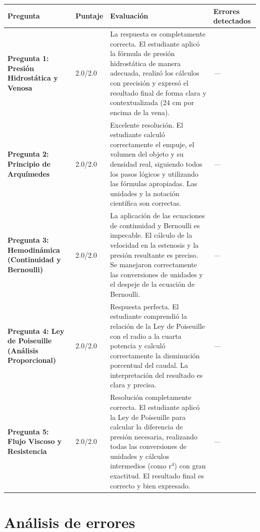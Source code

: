\documentclass[11pt,a4paper]{article}
\begin{document}
\begin{longtable}{>{\bfseries}p{2.8cm} p{1.6cm} p{7.0cm} p{2.8cm}}
  \toprule
  \textbf{Pregunta} & \textbf{Puntaje} & \textbf{Evaluación} & \textbf{Errores detectados} \\
  \midrule
  \endhead
  \bottomrule
  \endfoot
    \textbf{Pregunta 1: Presión Hidrostática y Venosa} & 2.0/2.0 & La respuesta es completamente correcta. El estudiante aplicó la fórmula de presión hidrostática de manera adecuada, realizó los cálculos con precisión y expresó el resultado final de forma clara y contextualizada (24 cm por encima de la vena). & \textit{---} \\
    \midrule
    \textbf{Pregunta 2: Principio de Arquímedes} & 2.0/2.0 & Excelente resolución. El estudiante calculó correctamente el empuje, el volumen del objeto y su densidad real, siguiendo todos los pasos lógicos y utilizando las fórmulas apropiadas. Las unidades y la notación científica son correctas. & \textit{---} \\
    \midrule
    \textbf{Pregunta 3: Hemodinámica (Continuidad y Bernoulli)} & 2.0/2.0 & La aplicación de las ecuaciones de continuidad y Bernoulli es impecable. El cálculo de la velocidad en la estenosis y la presión resultante es preciso. Se manejaron correctamente las conversiones de unidades y el despeje de la ecuación de Bernoulli. & \textit{---} \\
    \midrule
    \textbf{Pregunta 4: Ley de Poiseuille (Análisis Proporcional)} & 2.0/2.0 & Respuesta perfecta. El estudiante comprendió la relación de la Ley de Poiseuille con el radio a la cuarta potencia y calculó correctamente la disminución porcentual del caudal. La interpretación del resultado es clara y precisa. & \textit{---} \\
    \midrule
    \textbf{Pregunta 5: Flujo Viscoso y Resistencia} & 2.0/2.0 & Resolución completamente correcta. El estudiante aplicó la Ley de Poiseuille para calcular la diferencia de presión necesaria, realizando todas las conversiones de unidades y cálculos intermedios (como r$^{4}$) con gran exactitud. El resultado final es correcto y bien expresado. & \textit{---} \\
    \midrule
\end{longtable}

\section*{Análisis de errores}
\end{document}
